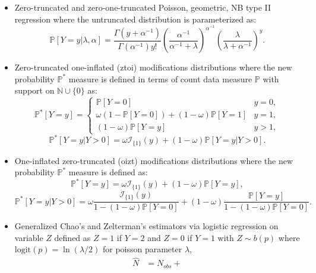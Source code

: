 \documentclass[
]{jss}
\newcommand{\1}{\mathcal{I}} \newcommand{\bZero}{\boldsymbol{0}}
\begin{document}
\begin{itemize}
    \item Zero-truncated and zero-one-truncated Poisson, geometric, NB type II regression where the untruncated distribution is parameterized as:
    \begin{equation*}
        \mathbb{P}[Y=y|\lambda,\alpha] = \frac{\Gamma\left(y+\alpha^{-1}\right)}{\Gamma\left(\alpha^{-1}\right)y!}
        \left(\frac{\alpha^{-1}}{\alpha^{-1}+\lambda}\right)^{\alpha^{-1}}
        \left(\frac{\lambda}{\lambda + \alpha^{-1}}\right)^{y}.
    \end{equation*}
    \item Zero-truncated one-inflated (ztoi) modifications distributions where the new probability $\mathbb{P}^{\ast}$ measure is defined in terms of count data measure $\mathbb{P}$ with support on $\mathbb{N}\cup\{0\}$ as:
    \begin{equation*}
    \mathbb{P}^{\ast}[Y=y]=
    \begin{cases}
    \mathbb{P}[Y=0] & y=0, \\
    \omega\left(1-\mathbb{P}[Y=0]\right)+(1-\omega)\mathbb{P}[Y=1] & y=1, \\
    (1-\omega)\mathbb{P}[Y=y] & y>1,
    \end{cases}
    \end{equation*}
    \begin{equation*}
        \mathbb{P}^{\ast}[Y=y|Y>0]=\omega\1_{\{1\}}(y)+(1-\omega)\mathbb{P}[Y=y|Y>0].
    \end{equation*}
    \item One-inflated zero-truncated (oizt) modifications distributions where the new probability $\mathbb{P}^{\ast}$ measure is defined as:
    \begin{equation*}
        \mathbb{P}^{\ast}[Y=y] = \omega \1_{\{1\}}(y)+(1-\omega)\mathbb{P}[Y=y],
    \end{equation*}
    \begin{equation*}
        \mathbb{P}^{\ast}[Y=y|Y>0] = 
        \omega\frac{\1_{\{1\}}(y)}{1-(1-\omega)\mathbb{P}[Y=0]}+
        (1-\omega)\frac{\mathbb{P}[Y=y]}{1-(1-\omega)\mathbb{P}[Y=0]}.
    \end{equation*}
    \item Generalized Chao's and Zelterman's estimators via logistic regression on variable $Z$ defined as $Z=1$ if $Y=2$ and $Z=0$ if $Y=1$ with $Z\sim b(p)$ where $\text{logit}(p)=\ln(\lambda/2)$ for poisson parameter $\lambda$,
    \begin{align}
        \hat{N} &= N_{obs}+

\end{align}
\end{itemize}
\end{document}
